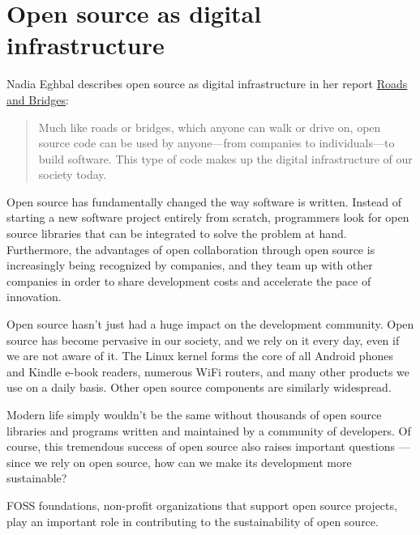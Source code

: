 


\chapter{Open source as digital infrastructure}

Nadia Eghbal describes open source as digital infrastructure in her report \href{https://www.fordfoundation.org/work/learning/research-reports/roads-and-bridges-the-unseen-labor-behind-our-digital-infrastructure/}{Roads and Bridges}:

\begin{quote}

Much like roads or bridges, which anyone can walk or drive on, open source code can be used by anyone—from companies to individuals—to build software. This type of code makes up the digital infrastructure of our society today.

\end{quote}

Open source has fundamentally changed the way software is written.  Instead of starting a new software project entirely from scratch, programmers look for open source libraries that can be integrated to solve the problem at hand.  Furthermore, the advantages of open collaboration through open source is increasingly being recognized by companies, and they team up with other companies in order to share development costs and accelerate the pace of innovation.

Open source hasn't just had a huge impact on the development community.  Open source has become pervasive in our society, and we rely on it every day, even if we are not aware of it.  The Linux kernel forms the core of all Android phones and Kindle e-book readers, numerous WiFi routers, and many other products we use on a daily basis.  Other open source components are similarly widespread.

Modern life simply wouldn't be the same without thousands of open source libraries and programs written and maintained by a community of developers.  Of course, this tremendous success of open source also raises important questions --- since we rely on open source, how can we make its development more sustainable?

FOSS foundations, non-profit organizations that support open source projects, play an important role in contributing to the sustainability of open source.

